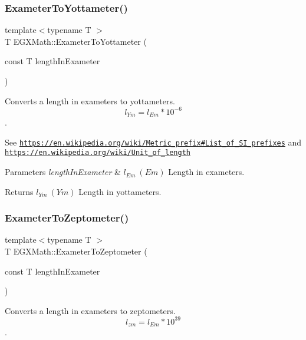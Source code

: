 \subsubsection{\texorpdfstring{Exameter\+To\+Yottameter()}{ExameterToYottameter()}}
{\footnotesize\ttfamily template$<$typename T $>$ \\
T E\+G\+X\+Math\+::\+Exameter\+To\+Yottameter (\begin{DoxyParamCaption}\item[{const T}]{length\+In\+Exameter }\end{DoxyParamCaption})}



Converts a length in exameters to yottameters. \[ l_{Ym}=l_{Em} * 10^{-6} \]. 

See \href{https://en.wikipedia.org/wiki/Metric_prefix#List_of_SI_prefixes}{\tt https\+://en.\+wikipedia.\+org/wiki/\+Metric\+\_\+prefix\#\+List\+\_\+of\+\_\+\+S\+I\+\_\+prefixes} and \href{https://en.wikipedia.org/wiki/Unit_of_length}{\tt https\+://en.\+wikipedia.\+org/wiki/\+Unit\+\_\+of\+\_\+length} 
\begin{DoxyParams}{Parameters}
{\em length\+In\+Exameter} & $ l_{Em}\ (Em)$ Length in exameters. \\
\hline
\end{DoxyParams}
\begin{DoxyReturn}{Returns}
$ l_{Ym}\ (Ym)$ Length in yottameters. 
\end{DoxyReturn}
\mbox{\label{group___e_g_x_math-_conversions-_length_conversions-_exameter-_s_i_ga5c4c4016d9d88622b4f3c5c071779025}} 
\subsubsection{\texorpdfstring{Exameter\+To\+Zeptometer()}{ExameterToZeptometer()}}
{\footnotesize\ttfamily template$<$typename T $>$ \\
T E\+G\+X\+Math\+::\+Exameter\+To\+Zeptometer (\begin{DoxyParamCaption}\item[{const T}]{length\+In\+Exameter }\end{DoxyParamCaption})}



Converts a length in exameters to zeptometers. \[ l_{zm}=l_{Em} * 10^{39} \]. 

